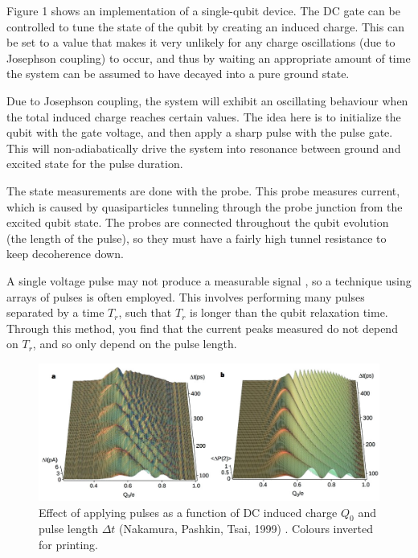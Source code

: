 \documentclass[12pt,letterpaper,notitlepage]{report}
\begin{document}
Figure 1 shows an implementation of a single-qubit device. The DC gate can be controlled to tune the state of the qubit by creating an induced charge. This can be set to a value that makes it very unlikely for any charge oscillations (due to Josephson coupling) to occur, and thus by waiting an appropriate amount of time the system can be assumed to have decayed into a pure ground state.

Due to Josephson coupling, the system will exhibit an oscillating behaviour when the total induced charge reaches certain values. The idea here is to initialize the qubit with the gate voltage, and then apply a sharp pulse with the pulse gate. This will non-adiabatically drive the system into resonance between ground and excited state for the pulse duration.

The state measurements are done with the probe. This probe measures current, which is caused by quasiparticles tunneling through the probe junction from the excited qubit state. The probes are connected throughout the qubit evolution (the length of the pulse), so they must have a fairly high tunnel resistance to keep decoherence down.

A single voltage pulse may not produce a measurable signal \cite{singleCPB}, so a technique using arrays of pulses is often employed. This involves performing many pulses separated by a time $T_r$, such that $T_r$ is longer than the qubit relaxation time. Through this method, you find that the current peaks measured do not depend on $T_r$, and so only depend on the pulse length.

\begin{figure}[ht]
    \centering
    \includegraphics[width=\textwidth]{img/nakamura-pulse-response.jpg}
    \caption{Effect of applying pulses as a function of DC induced charge $Q_0$ and pulse length $\Delta t$ (Nakamura, Pashkin, Tsai, 1999) \cite{singleCPB}. Colours inverted for printing.}
\end{figure}
\end{document}
